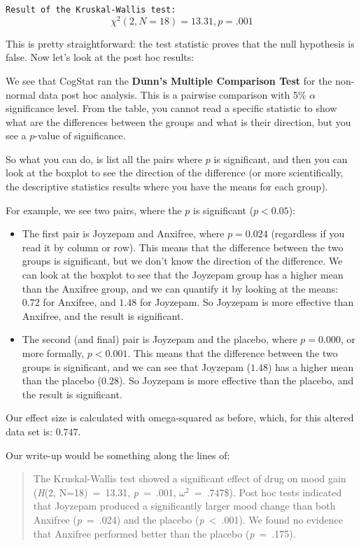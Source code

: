 \documentclass[
  11pt,
  a4paper,
  twoside,symmetric,openright]{book}
\providecommand{\tightlist}{%
  \setlength{\itemsep}{0pt}\setlength{\parskip}{0pt}}
\theoremstyle{break}
\theoremstyle{break}
\begin{document}
\texttt{Result\ of\ the\ Kruskal-Wallis\ test:}
\[
\chi^2(2, N = 18) = 13.31, p = .001
\]

This is pretty straightforward: the test statistic proves that the null hypothesis is false. Now let's look at the post hoc results:

We see that CogStat ran the \textbf{Dunn's Multiple Comparison Test} for the non-normal data post hoc analysis. This is a pairwise comparison with 5\% \(\alpha\) significance level. From the table, you cannot read a specific statistic to show what are the differences between the groups and what is their direction, but you see a \(p\)-value of significance.

So what you can do, is list all the pairs where \(p\) is significant, and then you can look at the boxplot to see the direction of the difference (or more scientifically, the descriptive statistics results where you have the means for each group).

For example, we see two pairs, where the \(p\) is significant (\(p < 0.05\)):

\begin{itemize}
\tightlist
\item
  The first pair is Joyzepam and Anxifree, where \(p = 0.024\) (regardless if you read it by column or row). This means that the difference between the two groups is significant, but we don't know the direction of the difference. We can look at the boxplot to see that the Joyzepam group has a higher mean than the Anxifree group, and we can quantify it by looking at the means: \(0.72\) for Anxifree, and \(1.48\) for Joyzepam. So Joyzepam is more effective than Anxifree, and the result is significant.
\item
  The second (and final) pair is Joyzepam and the placebo, where \(p = 0.000\), or more formally, \(p < 0.001\). This means that the difference between the two groups is significant, and we can see that Joyzepam (\(1.48\)) has a higher mean than the placebo (\(0.28\)). So Joyzepam is more effective than the placebo, and the result is significant.
\end{itemize}

Our effect size is calculated with omega-squared as before, which, for this altered data set is: \(0.747\).

Our write-up would be something along the lines of:

\begin{quote}
The Kruskal-Wallis test showed a significant effect of drug on mood gain (\emph{H}(2, N=18)~=~13.31, \emph{p}~=~.001, \(\omega^2\)~=~.747\$). Post hoc tests indicated that Joyzepam produced a significantly larger mood change than both Anxifree (\emph{p}~=~.024) and the placebo (\emph{p}~\textless~.001). We found no evidence that Anxifree performed better than the placebo (\emph{p}~=~.175).
\end{quote}
\end{document}
